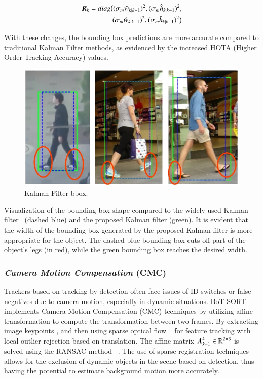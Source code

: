 \begin{equation}
  \begin{split}
      \vb*{R}_k = diag\big{(}(\sigma_{m} \hat{w}_{k|k-1})^2, (\sigma_{m} \hat{h}_{k|k-1})^2, \\
      (\sigma_{m} \hat{w}_{k|k-1})^2, (\sigma_{m} \hat{h}_{k|k-1})^2\big{)} 
  \end{split}
\end{equation}

With these changes, the bounding box predictions are more accurate compared to traditional Kalman Filter methods, as evidenced by the increased HOTA (Higher Order Tracking Accuracy) values.

\begin{figure}[H]
  \centering
  \includegraphics[scale=0.19]{gambar/KF_width.png}
  \caption{Kalman Filter bbox.}
  \label{fig:KF width}
\end{figure}

Visualization of the bounding box shape compared to the widely used Kalman filter~\cite{wojke2017simple} (dashed blue) and the proposed Kalman filter (green). It is evident that the width of the bounding box generated by the proposed Kalman filter is more appropriate for the object. The dashed blue bounding box cuts off part of the object's legs (in red), while the green bounding box reaches the desired width.

\subsubsection{\emph{Camera Motion Compensation} (CMC)}
\label{subsubsec:Camera Motion Compensation}

Trackers based on tracking-by-detection often face issues of ID switches or false negatives due to camera motion, especially in dynamic situations. BoT-SORT implements Camera Motion Compensation (CMC) techniques by utilizing affine transformation to compute the transformation between two frames. By extracting image keypoints \cite{shi1994good}, and then using sparse optical flow ~\cite{Bouguet1999PyramidalIO} for feature tracking with local outlier rejection based on translation. The affine matrix $\vb*{A}_{k-1}^k\in \mathbb{R}^{2 \times 3}$ is solved using the RANSAC method ~\cite{fischler1981random}. The use of sparse registration techniques allows for the exclusion of dynamic objects in the scene based on detection, thus having the potential to estimate background motion more accurately.

